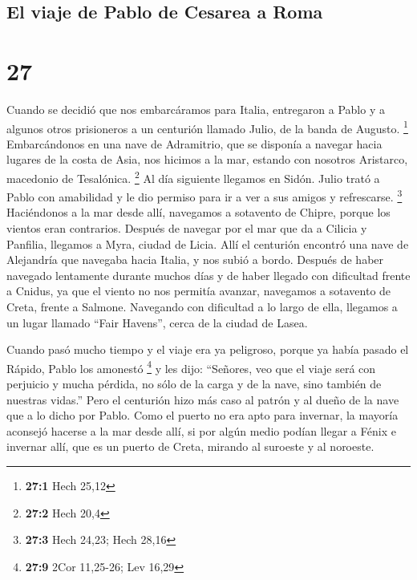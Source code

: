 \hypertarget{el-viaje-de-pablo-de-cesarea-a-roma}{%
\subsection{El viaje de Pablo de Cesarea a
Roma}\label{el-viaje-de-pablo-de-cesarea-a-roma}}

\hypertarget{section-26}{%
\section{27}\label{section-26}}

 Cuando se decidió que nos embarcáramos para Italia,
entregaron a Pablo y a algunos otros prisioneros a un centurión llamado
Julio, de la banda de Augusto. \footnote{\textbf{27:1} Hech 25,12}
 Embarcándonos en una nave de Adramitrio, que se disponía
a navegar hacia lugares de la costa de Asia, nos hicimos a la mar,
estando con nosotros Aristarco, macedonio de Tesalónica. \footnote{\textbf{27:2}
  Hech 20,4}  Al día siguiente llegamos en Sidón. Julio
trató a Pablo con amabilidad y le dio permiso para ir a ver a sus amigos
y refrescarse. \footnote{\textbf{27:3} Hech 24,23; Hech 28,16}
 Haciéndonos a la mar desde allí, navegamos a sotavento de
Chipre, porque los vientos eran contrarios.  Después de
navegar por el mar que da a Cilicia y Panfilia, llegamos a Myra, ciudad
de Licia.  Allí el centurión encontró una nave de
Alejandría que navegaba hacia Italia, y nos subió a bordo.
 Después de haber navegado lentamente durante muchos días
y de haber llegado con dificultad frente a Cnidus, ya que el viento no
nos permitía avanzar, navegamos a sotavento de Creta, frente a Salmone.
 Navegando con dificultad a lo largo de ella, llegamos a
un lugar llamado ``Fair Havens'', cerca de la ciudad de Lasea.

 Cuando pasó mucho tiempo y el viaje era ya peligroso,
porque ya había pasado el Rápido, Pablo los amonestó \footnote{\textbf{27:9}
  2Cor 11,25-26; Lev 16,29}  y les dijo: ``Señores, veo
que el viaje será con perjuicio y mucha pérdida, no sólo de la carga y
de la nave, sino también de nuestras vidas.''  Pero el
centurión hizo más caso al patrón y al dueño de la nave que a lo dicho
por Pablo.  Como el puerto no era apto para invernar, la
mayoría aconsejó hacerse a la mar desde allí, si por algún medio podían
llegar a Fénix e invernar allí, que es un puerto de Creta, mirando al
suroeste y al noroeste.

